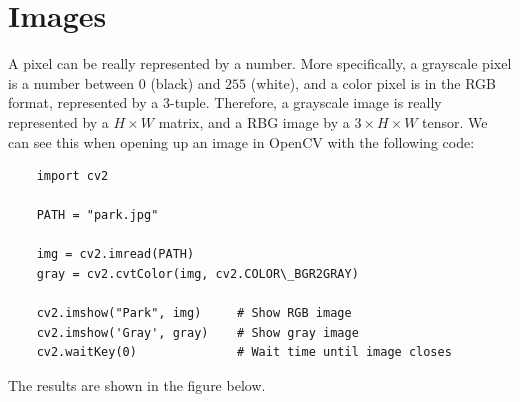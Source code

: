 \section{Images} 

  A pixel can be really represented by a number. More specifically, a grayscale pixel is a number between $0$ (black) and $255$ (white), and a color pixel is in the RGB format, represented by a $3$-tuple. Therefore, a grayscale image is really represented by a $H \times W$ matrix, and a RBG image by a $3 \times H \times W$ tensor. We can see this when opening up an image in OpenCV with the following code: 
  \begin{lstlisting}
    import cv2 

    PATH = "park.jpg"

    img = cv2.imread(PATH)
    gray = cv2.cvtColor(img, cv2.COLOR\_BGR2GRAY) 

    cv2.imshow("Park", img)     # Show RGB image
    cv2.imshow('Gray', gray)    # Show gray image
    cv2.waitKey(0)              # Wait time until image closes
  \end{lstlisting}

  The results are shown in the figure below.

